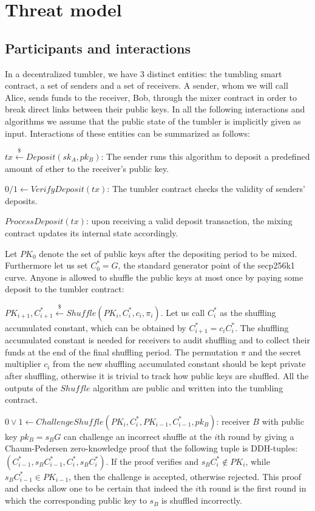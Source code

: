 \documentclass[conference, compsoc]{IEEEtran}
\theoremstyle{definition}
\begin{document}
\section{Threat model}
\subsection{Participants and interactions}
In a decentralized tumbler, we have $3$ distinct entities: the tumbling smart contract, a set of senders and a set of receivers. A sender, whom we will call Alice, sends funds to the receiver, Bob, through the mixer contract in order to break direct links between their public keys. In all the following interactions and algorithms we assume that the public state of the tumbler is implicitly given as input. Interactions of these entities can be summarized as follows: 

$tx\stackrel{\$}{\leftarrow}Deposit(sk_A,pk_B)$: The sender runs this algorithm to deposit a predefined amount of ether to the receiver's public key.

$0/1\leftarrow VerifyDeposit(tx)$: The tumbler contract checks the validity of senders' deposits.

$ProcessDeposit(tx)$: upon receiving a valid deposit transaction, the mixing contract updates its internal state accordingly.

Let $PK_{0}$ denote the set of public keys after the depositing period to be mixed. Furthermore let us set $C^{*}_{0}=G$, the standard generator point of the secp256k1 curve. Anyone is allowed to shuffle the public keys at most once by paying some deposit to the tumbler contract: 

$PK_{i+1},C_{i+1}^{*}\stackrel{\$}{\leftarrow}Shuffle(PK_{i},C^{*}_{i},c_{i},\pi_{i})$. Let us call $C^{*}_{i}$ as the shuffling accumulated constant, which can be obtained by $C^{*}_{i+1}=c_{i}C^{*}_{i}$. The shuffling accumulated constant is needed for receivers to audit shuffling and to collect their funds at the end of the final shuffling period. The permutation $\pi$ and the secret multiplier $c_{i}$ from the new shuffling accumulated constant should be kept private after shuffling, otherwise it is trivial to track how public keys are shuffled. All the outputs of the $Shuffle$ algorithm are public and written into the tumbling contract.  

$0\lor1\leftarrow 
ChallengeShuffle(PK_{i},C^{*}_{i},PK_{i-1},C^{*}_{i-1},pk_{B})$: receiver $B$ with public key $pk_{B}=s_{B}G$ can challenge an incorrect shuffle at the $i$th round by giving a Chaum-Pedersen zero-knowledge proof that the following tuple is DDH-tuples: $(C^{*}_{i-1}, s_{B}C^{*}_{i-1}, C^{*}_{i}, s_{B}C^{*}_{i})$. If the proof verifies and $s_{B}C^{*}_{i} \notin PK_{i}$, while $s_{B}C^{*}_{i-1} \in PK_{i-1}$, then the challenge is accepted, otherwise rejected. This proof and checks allow one to be certain that indeed the $i$th round is the first round in which the corresponding public key to $s_{B}$ is shuffled incorrectly.  
\end{document}
